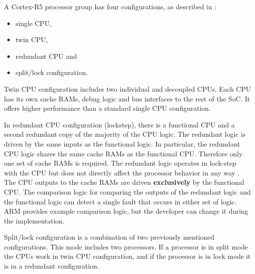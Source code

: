 A Cortex-R5 processor group has four configurations, as described in \citep{cortex_r5_reference_manual}:
\begin{itemize}

    \item single CPU,
    \item twin CPU,
    \item redundant CPU and
    \item split/lock configuration.
    
\end{itemize}

Twin CPU configuration includes two individual and decoupled CPUs. Each CPU has its own
cache RAMs, debug logic and bus interfaces to the rest of the SoC. It
offers higher performance than a standard single CPU configuration. 

In redundant CPU configuration (lockstep), there is a functional CPU and a second redundant copy of the majority of the CPU logic. The redundant logic is driven by the same inputs as the functional logic.  In particular, the redundant CPU logic shares the same cache RAMs as the functional CPU. Therefore only one set of cache RAMs is required. The redundant logic
operates in lock-step with the CPU but does not directly affect the processor behavior in any way \citep{cortex_r5_reference_manual}. The CPU outputs to the cache RAMs are driven \textbf{exclusively} by the functional CPU. The comparison logic for comparing the outputs of the redundant logic and the functional logic can detect a single fault that occurs in either set of logic. ARM provides example comparison logic, but the developer can change it during the implementation. 

Split/lock configuration is a combination of two previously mentioned configurations. This mode includes two processors. If a processor is in split mode the CPUs work in twin CPU configuration, and if the processor is in lock mode it is in a redundant configuration.

